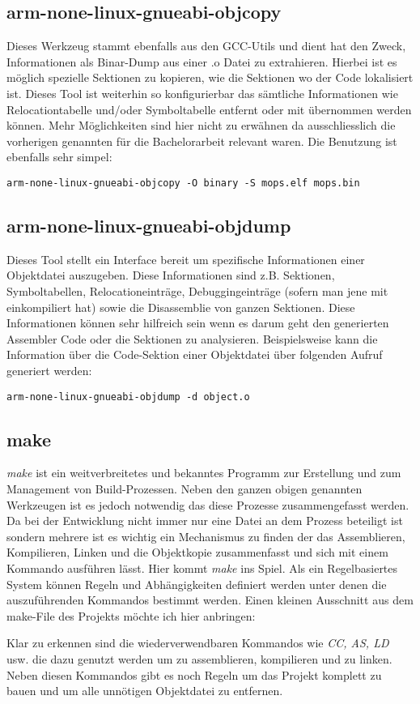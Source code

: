\subsection{arm-none-linux-gnueabi-objcopy}
\label{tools:copy}
Dieses Werkzeug stammt ebenfalls aus den GCC-Utils und dient hat den Zweck, Informationen als Binar-Dump aus einer .o Datei zu extrahieren. Hierbei ist es m\"oglich spezielle Sektionen zu kopieren, wie die Sektionen wo der Code lokalisiert ist. Dieses Tool ist weiterhin so konfigurierbar das s\"amtliche Informationen wie Relocationtabelle und/oder Symboltabelle entfernt oder mit \"ubernommen werden k\"onnen. Mehr M\"oglichkeiten sind hier nicht zu erw\"ahnen da ausschliesslich die vorherigen genannten f\"ur die Bachelorarbeit relevant waren. Die Benutzung ist ebenfalls sehr simpel:
\begin{lstlisting}[caption={Objektkopie in Bin\"arformat}]
arm-none-linux-gnueabi-objcopy -O binary -S mops.elf mops.bin
\end{lstlisting}

\subsection{arm-none-linux-gnueabi-objdump}
Dieses Tool stellt ein Interface bereit um spezifische Informationen einer Objektdatei auszugeben. Diese Informationen sind z.B. Sektionen, Symboltabellen, Relocationeintr\"age, Debuggingeintr\"age (sofern man jene mit einkompiliert hat) sowie die Disassemblie von ganzen Sektionen. Diese Informationen k\"onnen sehr hilfreich sein wenn es darum geht den generierten Assembler Code oder die Sektionen zu analysieren. Beispielsweise kann die Information \"uber die Code-Sektion einer Objektdatei \"uber folgenden Aufruf generiert werden:
\begin{lstlisting}[caption={Objdump einer Objektdatei}]
arm-none-linux-gnueabi-objdump -d object.o
\end{lstlisting}
\subsection{make}
\textit{make} ist ein weitverbreitetes und bekanntes Programm zur Erstellung und zum Management von Build-Prozessen. Neben den ganzen obigen genannten Werkzeugen ist es jedoch notwendig das diese Prozesse zusammengefasst werden. Da bei der Entwicklung nicht immer nur eine Datei an dem Prozess beteiligt ist sondern mehrere ist es wichtig ein Mechanismus zu finden der das Assemblieren, Kompilieren, Linken und die Objektkopie zusammenfasst und sich mit einem Kommando ausf\"uhren l\"asst. Hier kommt \textit{make} ins Spiel. Als ein Regelbasiertes System k\"onnen Regeln und Abh\"angigkeiten definiert werden unter denen die auszuf\"uhrenden Kommandos bestimmt werden. Einen kleinen Ausschnitt aus dem make-File des Projekts m\"ochte ich hier anbringen:

Klar zu erkennen sind die wiederverwendbaren Kommandos wie \textit{CC, AS, LD} usw. die dazu genutzt werden um zu assemblieren, kompilieren und zu linken. Neben diesen Kommandos gibt es noch Regeln um das Projekt komplett zu bauen und um alle unn\"otigen Objektdatei zu entfernen.

 